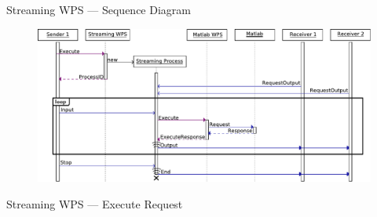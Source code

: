 \documentclass[xcolor=svgnames,professionalfonts,11pt,aspectratio=43]{beamer}
\begin{document}


\begin{frame}[c,fragile,label=sequencediagram]{Streaming WPS --- Sequence Diagram}
  \begin{figure}
    \begin{center}
      \includegraphics[width=\textwidth]{figures/sequence-diagram2.pdf}
    \end{center}
  \end{figure}
\end{frame}

\begin{frame}[c,fragile]{Streaming WPS --- Execute Request}
    \begin{center}
      
    \end{center}
\end{frame}
\end{document}
